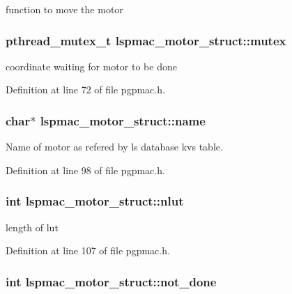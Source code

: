 function to move the motor \hypertarget{structlspmac__motor__struct_a188c5b1e991750ce2ffd53e0192e0907}{
\subsubsection[{mutex}]{\setlength{\rightskip}{0pt plus 5cm}pthread\_\-mutex\_\-t {\bf lspmac\_\-motor\_\-struct::mutex}}}
\label{structlspmac__motor__struct_a188c5b1e991750ce2ffd53e0192e0907}


coordinate waiting for motor to be done 

Definition at line 72 of file pgpmac.h.\hypertarget{structlspmac__motor__struct_aa90af2f6f1489f1befe1d0891e51575a}{
\subsubsection[{name}]{\setlength{\rightskip}{0pt plus 5cm}char$\ast$ {\bf lspmac\_\-motor\_\-struct::name}}}
\label{structlspmac__motor__struct_aa90af2f6f1489f1befe1d0891e51575a}


Name of motor as refered by ls database kvs table. 

Definition at line 98 of file pgpmac.h.\hypertarget{structlspmac__motor__struct_a11cbc6f50c150ed446e9a901cf7cc12b}{
\subsubsection[{nlut}]{\setlength{\rightskip}{0pt plus 5cm}int {\bf lspmac\_\-motor\_\-struct::nlut}}}
\label{structlspmac__motor__struct_a11cbc6f50c150ed446e9a901cf7cc12b}


length of lut 

Definition at line 107 of file pgpmac.h.\hypertarget{structlspmac__motor__struct_ab7bd8bff48953ce05c758598d75877ac}{
\subsubsection[{not\_\-done}]{\setlength{\rightskip}{0pt plus 5cm}int {\bf lspmac\_\-motor\_\-struct::not\_\-done}}}
\label{structlspmac__motor__struct_ab7bd8bff48953ce05c758598d75877ac}


